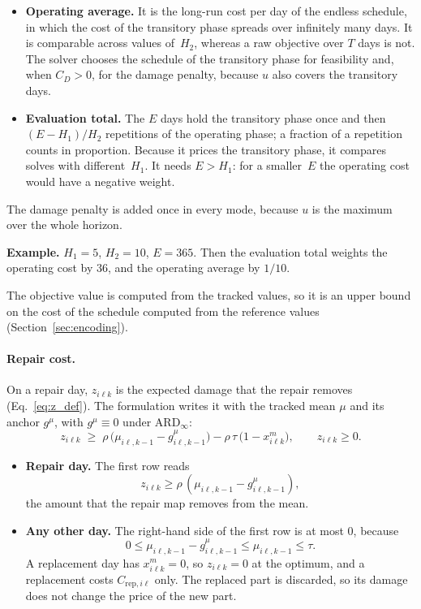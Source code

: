 \documentclass[11pt,a4paper]{article}
\theoremstyle{plain}
\theoremstyle{definition}
\theoremstyle{remark}
\begin{document}
\begin{itemize}
  \item \textbf{Operating average.} It is the long-run cost per day of the endless schedule, in which the cost of the transitory phase spreads over infinitely many days.
    It is comparable across values of~$H_2$, whereas a raw objective over $T$ days is not.
    The solver chooses the schedule of the transitory phase for feasibility and, when $C_D > 0$, for the damage penalty, because $u$ also covers the transitory days.
  \item \textbf{Evaluation total.} The $E$ days hold the transitory phase once and then $(E - H_1)/H_2$ repetitions of the operating phase; a fraction of a repetition counts in proportion.
    Because it prices the transitory phase, it compares solves with different~$H_1$.
    It needs $E > H_1$: for a smaller~$E$ the operating cost would have a negative weight.
\end{itemize}
The damage penalty is added once in every mode, because $u$ is the maximum over the whole horizon.
\begin{examplebox}
\textbf{Example.} $H_1 = 5$, $H_2 = 10$, $E = 365$.
Then the evaluation total weights the operating cost by $36$, and the operating average by $1/10$.
\end{examplebox}

The objective value is computed from the tracked values, so it is an upper bound on the cost of the schedule computed from the reference values (Section~\ref{sec:encoding}).

\paragraph{Repair cost.}
On a repair day, $z_{i\ell k}$ is the expected damage that the repair removes (Eq.~\eqref{eq:z_def}).
The formulation writes it with the tracked mean $\mu$ and its anchor $g^{\mu}$, with $g^{\mu} \equiv 0$ under $\text{ARD}_\infty$:
\begin{equation}\label{eq:z_row}
  z_{i\ell k} \;\ge\; \rho\,\bigl(\mu_{i\ell,k-1} - g^{\mu}_{i\ell,k-1}\bigr) - \rho\,\tau\,\bigl(1 - x^m_{i\ell k}\bigr),
  \qquad z_{i\ell k} \ge 0 .
\end{equation}
\begin{itemize}
  \item \textbf{Repair day.} The first row reads
    \begin{equation}
      z_{i\ell k} \ge \rho\,(\mu_{i\ell,k-1} - g^{\mu}_{i\ell,k-1}),
    \end{equation}
    the amount that the repair map removes from the mean.
  \item \textbf{Any other day.} The right-hand side of the first row is at most $0$, because
    \begin{equation}
      0 \le \mu_{i\ell,k-1} - g^{\mu}_{i\ell,k-1} \le \mu_{i\ell,k-1} \le \tau.
    \end{equation}
    A replacement day has $x^m_{i\ell k} = 0$, so $z_{i\ell k} = 0$ at the optimum, and a replacement costs $C_{\mathrm{rep},i\ell}$ only.
    The replaced part is discarded, so its damage does not change the price of the new part.
\end{itemize}
\end{document}
